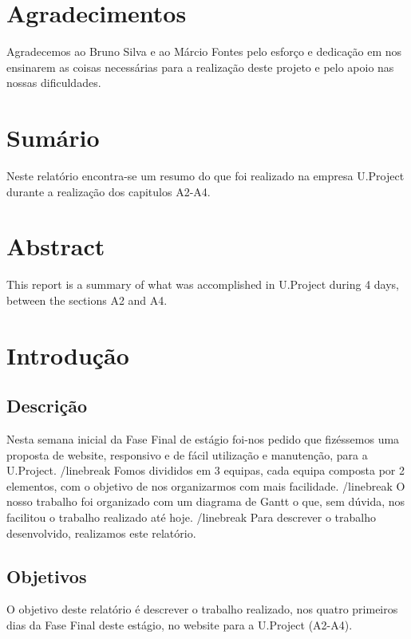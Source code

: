 \documentclass[11pt]{report}
\begin{document}
\newpage


\chapter*{Agradecimentos}
Agradecemos ao Bruno Silva e ao Márcio Fontes pelo esforço e dedicação em nos ensinarem as coisas necessárias para a realização deste projeto e pelo apoio nas nossas dificuldades.
\newpage

\chapter*{Sumário}
Neste relatório encontra-se um resumo do que foi realizado na empresa U.Project durante a realização dos capitulos A2-A4.
\newpage

\chapter*{Abstract}
This report is a summary of what was accomplished in U.Project during 4 days, between the sections A2 and A4.
\tableofcontents

\newpage


\newpage

\chapter{Introdução}

\section{Descrição}
Nesta semana inicial da Fase Final de estágio foi-nos pedido que fizéssemos uma proposta de website, responsivo e de fácil utilização e manutenção, para a U.Project. /linebreak
Fomos divididos em 3 equipas, cada equipa composta por 2 elementos, com o objetivo de nos organizarmos com mais facilidade. /linebreak
O nosso trabalho foi organizado com um diagrama de Gantt o que, sem dúvida, nos facilitou o trabalho realizado até hoje. /linebreak
Para descrever o trabalho desenvolvido, realizamos este relatório.
\section{Objetivos}
O objetivo deste relatório é descrever o trabalho realizado, nos quatro primeiros dias da Fase Final deste estágio, no website para a U.Project (A2-A4).
\end{document}
